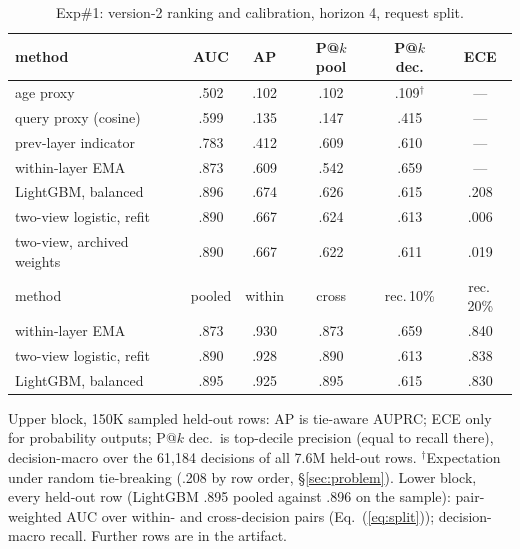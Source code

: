 \begin{table}[t]
\centering
\caption{Exp\#1: version-2 ranking and calibration, horizon 4, request split.}
\label{tab:v2}\label{tab:main}
\footnotesize
\setlength{\tabcolsep}{2pt}
\begin{tabular*}{\columnwidth}{@{\extracolsep{\fill}}lccccc@{}}
\toprule
method & AUC & AP & P@$k$ pool & P@$k$ dec. & ECE \\
\midrule
age proxy & .502 & .102 & .102 & .109$^{\dagger}$ & --- \\
query proxy (cosine) & .599 & .135 & .147 & .415 & --- \\
prev-layer indicator & .783 & .412 & .609 & .610 & --- \\
within-layer EMA & .873 & .609 & .542 & .659 & --- \\
LightGBM, balanced & .896 & .674 & .626 & .615 & .208 \\
two-view logistic, refit & .890 & .667 & .624 & .613 & .006 \\
two-view, archived weights & .890 & .667 & .622 & .611 & .019 \\
\midrule
method & pooled & within & cross & rec.\,10\% & rec.\,20\% \\
\midrule
within-layer EMA & .873 & .930 & .873 & .659 & .840 \\
two-view logistic, refit & .890 & .928 & .890 & .613 & .838 \\
LightGBM, balanced & .895 & .925 & .895 & .615 & .830 \\
\bottomrule
\end{tabular*}
\par\smallskip
\begin{minipage}{\columnwidth}\footnotesize
Upper block, 150K sampled held-out rows: AP is tie-aware AUPRC; ECE only for
probability outputs; P@$k$ dec.\ is top-decile precision (equal to recall there),
decision-macro over the 61,184 decisions of all 7.6M held-out rows.
$^{\dagger}$Expectation under random tie-breaking (.208 by row order,
\S\ref{sec:problem}). Lower block, every held-out row (LightGBM .895 pooled against
.896 on the sample): pair-weighted AUC over within- and cross-decision pairs
(Eq.~(\ref{eq:split})); decision-macro recall. Further rows are in the artifact.
\end{minipage}
\end{table}
